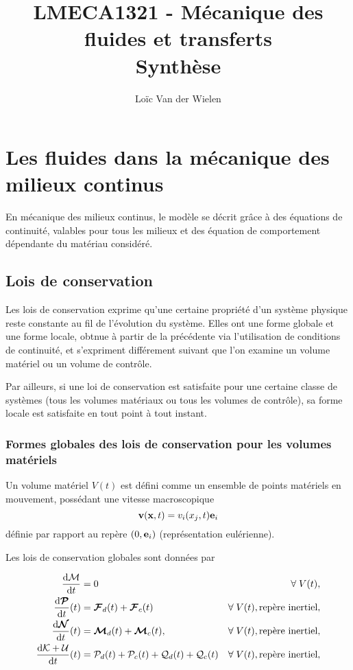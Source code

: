 \documentclass[a4paper,11pt]{report}
\title{LMECA1321 - Mécanique des fluides et transferts\\Synthèse}
\author{Loïc Van der Wielen}
\begin{document}
\maketitle
\tableofcontents

\chapter{Les fluides dans la mécanique des milieux continus}
  En mécanique des milieux continus, le modèle se décrit grâce à des équations de continuité, valables pour tous les milieux et des équation de comportement dépendante du matériau considéré.

  \section{Lois de conservation}
    Les lois de conservation exprime qu'une certaine propriété d'un système physique reste constante au fil de l'évolution du système. Elles ont une forme globale et une forme locale, obtnue à partir de la précédente via l'utilisation de conditions de continuité, et s'expriment différement suivant que l'on examine un volume matériel ou un volume de contrôle.

    Par ailleurs, si une loi de conservation est satisfaite pour une certaine classe de systèmes (tous les volumes matériaux ou tous les volumes de contrôle), sa forme locale est satisfaite en tout point à tout instant.

    \subsection{Formes globales des lois de conservation pour les volumes matériels}
      Un volume matériel $V(t)$ est défini comme un ensemble de points matériels en mouvement, possédant une vitesse macroscopique
      \begin{equation}
        \vb{v}(\vb{x}, t) = v_i(x_j, t)\vb{e}_i
      \end{equation}
      définie par rapport au repère $(0, \vb{e}_i)$ (représentation eulérienne).

      Les lois de conservation globales sont données par

      \begin{align}
        \dv{\mathcal{M}}{t} &= 0 & \forall \; V(t),\nonumber\\
        \dv{\boldsymbol{\mathcal{P}}}{t} {}(t) &= \boldsymbol{\mathcal{F}}_d(t) + \boldsymbol{\mathcal{F}}_c(t) & \forall \; V(t), \textrm{repère inertiel},\\
        \dv{\boldsymbol{\mathcal{N}}}{t} {}(t) &= \boldsymbol{\mathcal{M}}_d(t) + \boldsymbol{\mathcal{M}}_c(t), & \forall \; V(t), \textrm{repère inertiel}, \nonumber\\
        \dv{\mathcal{K} + \mathcal{U}}{t} {}(t) &= \mathcal{P}_d(t) + \mathcal{P}_c(t) + \mathcal{Q}_d(t) + \mathcal{Q}_c(t) & \forall \; V(t), \textrm{repère inertiel}, \nonumber
      \end{align}
\end{document}
